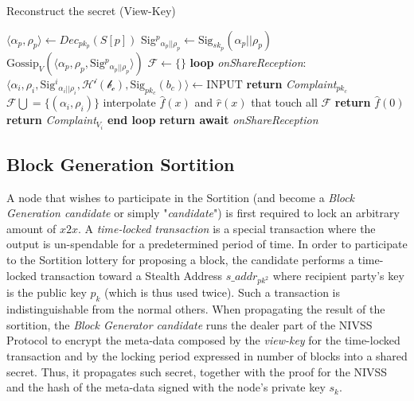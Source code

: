     \begin{algorithm}
        \caption{Reconstruct the secret (View-Key)}
        \begin{algorithmic}[1]
                \State $\langle\alpha_p, \rho_p\rangle \leftarrow Dec_{pk_p}(S[p])$
                \State Sig${^p}_{\alpha_p||\rho_p} \leftarrow \textrm{Sig}_{sk_p}(\alpha_p||\rho_p)$
                \State $\textrm{Gossip}_V(\langle\alpha_p, \rho_p, \textrm{Sig}{^p}_{\alpha_p||\rho_p}\rangle)$ 
                \State $\mathcal{F} \leftarrow \{\}$ 
                \BState \textbf{loop} \emph{onShareReception}:
                \State $\langle\alpha_i, \rho_i, \textrm{Sig}{^i}_{\alpha_i||\rho_i}, \mathcal{H^i(b_c)}, \textrm{Sig}_{pk_c}(b_c)\rangle \leftarrow \textrm{INPUT}$
                 
                	\State \textbf{return} \textit{Complaint}$_{pk_c}$ 
                    \State $\mathcal{F} \bigcup = \{(\alpha_i, \rho_i)\}$
                    	\State interpolate $\hat{f}(x)$ and $\hat{r}(x)$ that touch all $\mathcal{F}$ 
                        \State \textbf{return }$\hat{f}(0)$
                    \EndIf
                \Else
                	\State \textbf{return} \textit{Complaint}$_{V_i}$
                \EndIf
                \BState \textbf{end loop}
                \State \textbf{return await} \emph{onShareReception}                
            \EndProcedure
        \end{algorithmic}
    \end{algorithm}


\subsection{Block Generation Sortition}

A node that wishes to participate in the Sortition (and become a \textit{Block Generation candidate} or simply "\textit{candidate}") is first required to lock an arbitrary amount of $x2x$. A \textit{time-locked transaction} is a special transaction where the output is un-spendable for a predetermined period of time. In order to participate to the Sortition lottery for proposing a block, the candidate performs a time-locked transaction toward a Stealth Address $s\_addr_{pk^2}$ where recipient party's key is the public key $p_k$ (which is thus used twice). Such a transaction is indistinguishable from the normal others. When propagating the result of the sortition, the \textit{Block Generator candidate} runs the dealer part of the NIVSS Protocol to encrypt the meta-data composed by the \textit{view-key} for the time-locked transaction and by the locking period expressed in number of blocks into a shared secret. Thus, it propagates such secret, together with the proof for the NIVSS and the hash of the meta-data signed with the node's private key $s_k$. 

